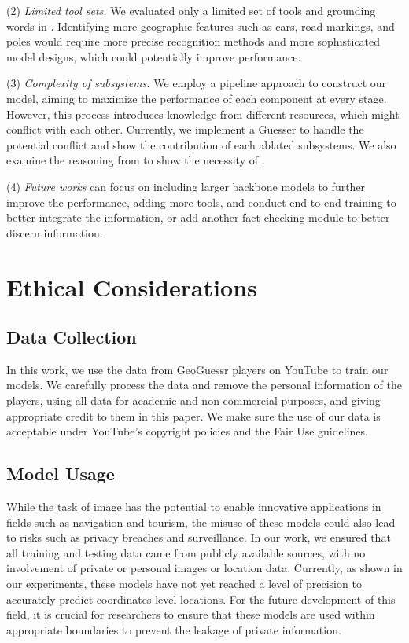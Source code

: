(2) \textit{Limited tool sets.} We evaluated only a limited set of tools and grounding words in \micname. Identifying more geographic features such as cars, road markings, and poles would require more precise recognition methods and more sophisticated model designs, which could potentially improve performance. 

(3) \textit{Complexity of subsystems.} We employ a pipeline approach to construct our model, aiming to maximize the performance of each component at every stage. However, this process introduces knowledge from different resources, which might conflict with each other. Currently, we implement a Guesser to handle the potential conflict and show the contribution of each ablated subsystems. We also examine the reasoning from \macname to show the necessity of \micname.

(4) \textit{Future works} can focus on including larger backbone models to further improve the performance, adding more tools, and conduct end-to-end training to better integrate the information, or add another fact-checking module to better discern information. 


\section*{Ethical Considerations}

\subsection*{Data Collection}

In this work, we use the data from GeoGuessr players on YouTube to train our models. We carefully process the data and remove the personal information of the players, using all data for academic and non-commercial purposes, and giving appropriate credit to them in this paper. We make sure the use of our data is acceptable under YouTube's copyright policies and the Fair Use guidelines. 

\subsection*{Model Usage}

While the task of image \geoloc has the potential to enable innovative applications in fields such as navigation and tourism, the misuse of these models could also lead to risks such as privacy breaches and surveillance. In our work, we ensured that all training and testing data came from publicly available sources, with no involvement of private or personal images or location data. Currently, as shown in our experiments, these models have not yet reached a level of precision to accurately predict coordinates-level locations. For the future development of this field, it is crucial for researchers to ensure that these models are used within appropriate boundaries to prevent the leakage of private information. 